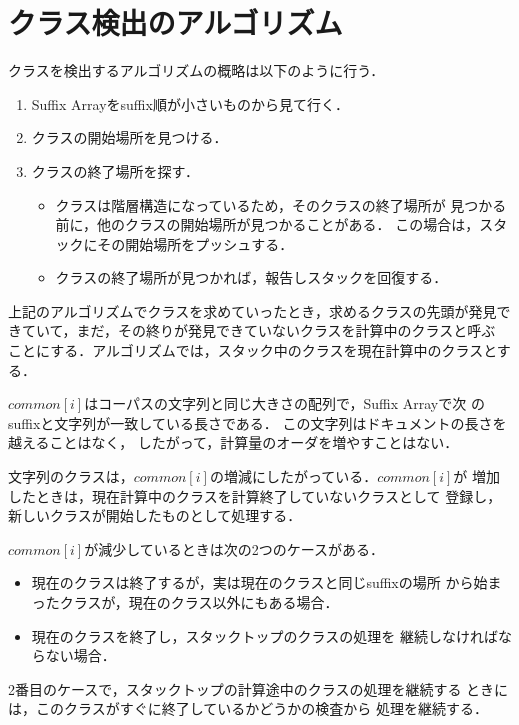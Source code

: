 \section{クラス検出のアルゴリズム}
クラスを検出するアルゴリズムの概略は以下のように行う．

\begin{enumerate}
 \item Suffix Arrayをsuffix順が小さいものから見て行く．
 \item クラスの開始場所を見つける．
 \item クラスの終了場所を探す．
       \begin{itemize}
        \item クラスは階層構造になっているため，そのクラスの終了場所が
              見つかる前に，他のクラスの開始場所が見つかることがある．
              この場合は，スタックにその開始場所をプッシュする．
        \item クラスの終了場所が見つかれば，報告しスタックを回復する．
       \end{itemize}
\end{enumerate}

上記のアルゴリズムでクラスを求めていったとき，求めるクラスの先頭が発見で
きていて，まだ，その終りが発見できていないクラスを計算中のクラスと呼ぶ
ことにする．アルゴリズムでは，スタック中のクラスを現在計算中のクラスとする．
\par 

$common[i]$はコーパスの文字列と同じ大きさの配列で，Suffix Arrayで次
のsuffixと文字列が一致している長さである．
この文字列はドキュメントの長さを越えることはなく，
したがって，計算量のオーダを増やすことはない．\par

文字列のクラスは，$common[i]$の増減にしたがっている．$common[i]$が
増加したときは，現在計算中のクラスを計算終了していないクラスとして
登録し，新しいクラスが開始したものとして処理する．\par

$common[i]$が減少しているときは次の2つのケースがある．

 \begin{itemize}
  \item 現在のクラスは終了するが，実は現在のクラスと同じsuffixの場所
        から始まったクラスが，現在のクラス以外にもある場合．
  \item 現在のクラスを終了し，スタックトップのクラスの処理を
	継続しなければならない場合．
 \end{itemize}

2番目のケースで，スタックトップの計算途中のクラスの処理を継続する
ときには，このクラスがすぐに終了しているかどうかの検査から
処理を継続する．


